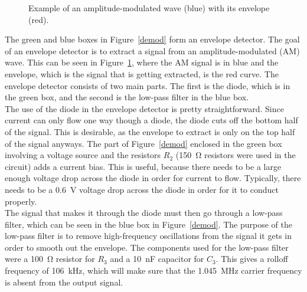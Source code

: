 \documentclass[11pt,letterpaper]{article}
\begin{document}
\begin{figure}
    \centering
    \caption{Example of an amplitude-modulated wave (blue) with its envelope
    (red).}
    \label{amwave}
\end{figure}

The green and blue boxes in Figure~\ref{demod} form an envelope detector. The
goal of an envelope detector is to extract a signal from an amplitude-modulated
(AM) wave. This can be seen in Figure~\ref{amwave}, where the AM signal is in
blue and the envelope, which is the signal that is getting extracted, is the red
curve. The envelope detector consists of two main parts. The first is the diode,
which is in the green box, and the second is the low-pass filter in the blue
box.\\

The use of the diode in the envelope detector is pretty straightforward. Since
current can only flow one way though a diode, the diode cuts off the bottom half
of the signal. This is desirable, as the envelope to extract is only on the top
half of the signal anyways. The part of Figure~\ref{demod} enclosed in the green
box involving a voltage source and the resistors $R_2$ (\SI{150}{\ohm} resistors
were used in the circuit) adds a current bias. This is useful, because there
needs to be a large enough voltage drop across the diode in order for current to
flow. Typically, there needs to be a \SI{0.6}{\volt} voltage drop across the
diode in order for it to conduct properly.\\

The signal that makes it through the diode must then go through a low-pass
filter, which can be seen in the blue box in Figure~\ref{demod}. The purpose of
the low-pass filter is to remove high-frequency oscillations from the signal it
gets in order to smooth out the envelope. The components used for the low-pass
filter were a \SI{100}{\ohm} resistor for $R_3$ and a \SI{10}{\nano\farad}
capacitor for $C_3$. This gives a rolloff frequency of \SI{106}{\kilo\hertz},
which will make sure that the \SI{1.045}{\mega\hertz} carrier frequency is
absent from the output signal.
\end{document}
